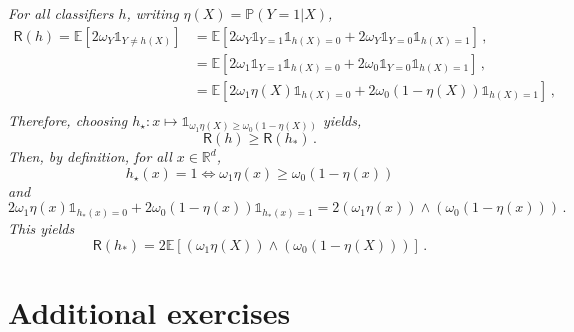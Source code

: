 \documentclass[a4paper,10pt,fleqn]{article}
\newcommand{\eqsp}{\,}
\newcommand{\bP}{\mathbb{P}}
\newcommand{\1}{\ensuremath{\mathbbm{1}}}
\newcommand{\bE}{\mathbb{E}}
\begin{document}
{\em
For all classifiers $h$, writing $\eta(X) = \bP(Y=1|X)$,
\begin{align*}
\mathsf{R}(h) = \bE[2\omega_Y \mathds{1}_{Y\neq h(X)}] &= \bE[2\omega_Y \mathds{1}_{Y=1}\mathds{1}_{h(X)=0} + 2\omega_Y \mathds{1}_{Y=0}\mathds{1}_{h(X)=1}]\eqsp,\\ 
&= \bE[2\omega_1 \mathds{1}_{Y=1}\mathds{1}_{h(X)=0} + 2\omega_0 \mathds{1}_{Y=0}\mathds{1}_{h(X)=1}]\eqsp,\\ 
&= \bE[2\omega_1 \eta(X)\mathds{1}_{h(X)=0} + 2\omega_0 (1-\eta(X))\mathds{1}_{h(X)=1}]\eqsp,\\ 
\end{align*}
Therefore, choosing $h_\star:x\mapsto \mathds{1}_{\omega_1 \eta(X)\geqslant \omega_0 (1-\eta(X))}$ yields,
$$
\mathsf{R}(h) \geqslant \mathsf{R}(h_*)\eqsp. 
$$
Then, by definition, for all $x\in\mathbb{R}^d$,
$$
h_\star(x) = 1 \Leftrightarrow \omega_1 \eta(x) \geqslant \omega_0 (1-\eta(x))
$$
and 
$$
2\omega_1 \eta(x)\mathds{1}_{h_*(x)=0} + 2\omega_0 (1-\eta(x))\mathds{1}_{h_*(x)=1} = 2 \left(\omega_1 \eta(x)\right) \wedge \left(\omega_0 (1-\eta(x))\right)\eqsp.
$$
This yields
$$
\mathsf{R}(h_*) = 2\bE[ \left(\omega_1 \eta(X)\right) \wedge \left(\omega_0 (1-\eta(X))\right)]\eqsp.
$$
}


\section{Additional exercises}
\end{document}
